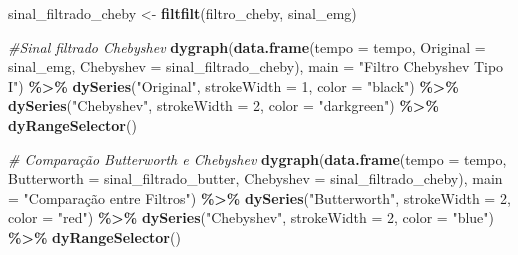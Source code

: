 \documentclass[
]{article}
\newenvironment{Shaded}{\begin{snugshade}}{\end{snugshade}}
\newcommand{\AttributeTok}[1]{\textcolor[rgb]{0.13,0.29,0.53}{#1}}
\newcommand{\CommentTok}[1]{\textcolor[rgb]{0.56,0.35,0.01}{\textit{#1}}}
\newcommand{\DecValTok}[1]{\textcolor[rgb]{0.00,0.00,0.81}{#1}}
\newcommand{\FunctionTok}[1]{\textcolor[rgb]{0.13,0.29,0.53}{\textbf{#1}}}
\newcommand{\NormalTok}[1]{#1}
\newcommand{\OtherTok}[1]{\textcolor[rgb]{0.56,0.35,0.01}{#1}}
\newcommand{\SpecialCharTok}[1]{\textcolor[rgb]{0.81,0.36,0.00}{\textbf{#1}}}
\newcommand{\StringTok}[1]{\textcolor[rgb]{0.31,0.60,0.02}{#1}}
\begin{document}
\begin{Shaded}
\begin{Highlighting}[]
\NormalTok{sinal\_filtrado\_cheby }\OtherTok{\textless{}{-}} \FunctionTok{filtfilt}\NormalTok{(filtro\_cheby, sinal\_emg)}

\CommentTok{\#Sinal filtrado Chebyshev}
\FunctionTok{dygraph}\NormalTok{(}\FunctionTok{data.frame}\NormalTok{(}\AttributeTok{tempo =}\NormalTok{ tempo, }\AttributeTok{Original =}\NormalTok{ sinal\_emg, }\AttributeTok{Chebyshev =}\NormalTok{ sinal\_filtrado\_cheby),}
        \AttributeTok{main =} \StringTok{"Filtro Chebyshev Tipo I"}\NormalTok{) }\SpecialCharTok{\%\textgreater{}\%}
  \FunctionTok{dySeries}\NormalTok{(}\StringTok{"Original"}\NormalTok{, }\AttributeTok{strokeWidth =} \DecValTok{1}\NormalTok{, }\AttributeTok{color =} \StringTok{"black"}\NormalTok{) }\SpecialCharTok{\%\textgreater{}\%}
  \FunctionTok{dySeries}\NormalTok{(}\StringTok{"Chebyshev"}\NormalTok{, }\AttributeTok{strokeWidth =} \DecValTok{2}\NormalTok{, }\AttributeTok{color =} \StringTok{"darkgreen"}\NormalTok{) }\SpecialCharTok{\%\textgreater{}\%}
  \FunctionTok{dyRangeSelector}\NormalTok{()}
\end{Highlighting}
\end{Shaded}

\begin{Shaded}
\begin{Highlighting}[]
\CommentTok{\# Comparação Butterworth e Chebyshev}
\FunctionTok{dygraph}\NormalTok{(}\FunctionTok{data.frame}\NormalTok{(}\AttributeTok{tempo =}\NormalTok{ tempo,}
                   \AttributeTok{Butterworth =}\NormalTok{ sinal\_filtrado\_butter,}
                   \AttributeTok{Chebyshev =}\NormalTok{ sinal\_filtrado\_cheby),}
        \AttributeTok{main =} \StringTok{"Comparação entre Filtros"}\NormalTok{) }\SpecialCharTok{\%\textgreater{}\%}
  \FunctionTok{dySeries}\NormalTok{(}\StringTok{"Butterworth"}\NormalTok{, }\AttributeTok{strokeWidth =} \DecValTok{2}\NormalTok{, }\AttributeTok{color =} \StringTok{"red"}\NormalTok{) }\SpecialCharTok{\%\textgreater{}\%}
  \FunctionTok{dySeries}\NormalTok{(}\StringTok{"Chebyshev"}\NormalTok{, }\AttributeTok{strokeWidth =} \DecValTok{2}\NormalTok{, }\AttributeTok{color =} \StringTok{"blue"}\NormalTok{) }\SpecialCharTok{\%\textgreater{}\%}
  \FunctionTok{dyRangeSelector}\NormalTok{()}
\end{Highlighting}
\end{Shaded}
\end{document}
